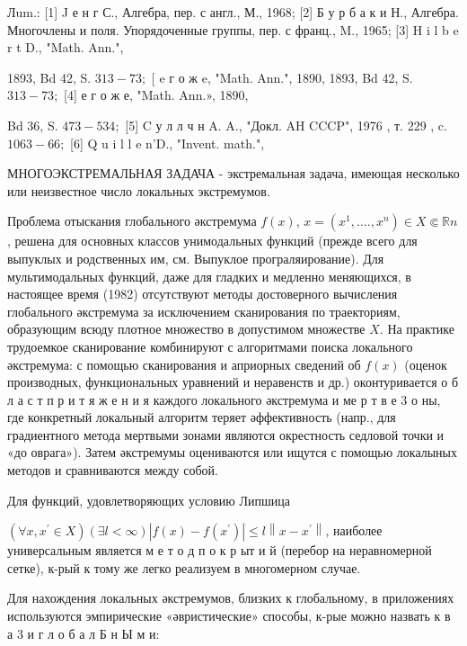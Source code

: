 \documentclass[10pt]{article}
\begin{document}
Лum.: [1] J е н г С., Алгебра, пер. с англ., М., 1968; [2] Б у р б а к и Н., Алгебра. Многочлены и поля. Упорядоченные группы, пер. с франц., M., 1965; [3] H i l b e r t D., "Math. Ann.",

1893, Bd 42, S. $313-73 ;$ [ e г о ж e, "Math. Ann.", 1890, 1893, Bd 42, S. $313-73 ;$ [4] е г о ж е, "Math. Ann.», 1890,

Bd 36, S. $473-534 ;$ [5] C у л л ч н A. A., "Докл. AH CCCP", 1976 , т. 229 , c. $1063-66 ;$ [6] Q u i l l e n'D., "Invent. math.",



МНОГОЭКСТРЕМАЛЬНАЯ ЗАДАЧА - экстремальная задача, имеющая несколько или неизвестное число локальных экстремумов.



Проблема отыскания глобального әкстремума $f(x)$, $x=\left(x^{1}, \ldots ., x^{n}\right) \in X \Subset \mathbb{R} n$, решена для основных классов унимодальных функций (прежде всего для выпуклых и родственных им, см. Выпуклое програляирование). Для мультимодальных функций, даже для гладких и медленно меняющихся, в настоящее время (1982) отсутствуют методы достоверного вычисления глобального әкстремума за исключением сканирования по траекториям, образующим всюду плотное множество в допустимом множестве $X$. На практике трудоемкое сканирование комбинируют с алгоритмами поиска локального әкстремума: с помощью сканирования и априорных сведений об $f(x)$ (оценок производных, функциональных уравнений и неравенств и др.) оконтуривается о б л а с т п р и т я ж е н и я каждого локального әкстремума и ме р т в е 3 о ны, где конкретный локальный алгоритм теряет әффективность (напр., для градиентного метода мертвыми зонами являются окрестность седловой точки и «до оврага»). Затем әкстремумы оцениваются или ищутся с помощью локалыных методов и сравниваются между собой.



Для функций, удовлетворяющих условию Липшица



$\left(\forall x, x^{\prime} \in X\right)(\exists l<\infty)\left|f(x)-f\left(x^{\prime}\right)\right| \leqslant l\left\|x-x^{\prime}\right\|$, наиболее универсальным является м е т о д п о к р ыт и й (перебор на неравномерной сетке), к-рый к тому же легко реализуем в многомерном случае.



Для нахождения локальных әкстремумов, близких к глобальному, в приложениях используются эмпирические «әвристические» способы, к-рые можно назвать к в а 3 и г л о б а л Б н Ы м и:
\end{document}
